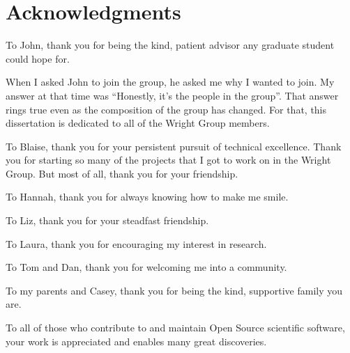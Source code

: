 \chapter*{Acknowledgments}

\singlespacing

To John, thank you for being the kind, patient advisor any graduate student could hope for.

When I asked John to join the group, he asked me why I wanted to join.
My answer at that time was ``Honestly, it's the people in the group''.
That answer rings true even as the composition of the group has changed.
For that, this dissertation is dedicated to all of the Wright Group members.

To Blaise, thank you for your persistent pursuit of technical excellence.
Thank you for starting so many of the projects that I got to work on in the Wright Group.
But most of all, thank you for your friendship.

To Hannah, thank you for always knowing how to make me smile.

To Liz, thank you for your steadfast friendship.

To Laura, thank you for encouraging my interest in research.

To Tom and Dan, thank you for welcoming me into a community.

To my parents and Casey, thank you for being the kind, supportive family you are.

To all of those who contribute to and maintain Open Source scientific software, your work is appreciated and enables many great discoveries. 
